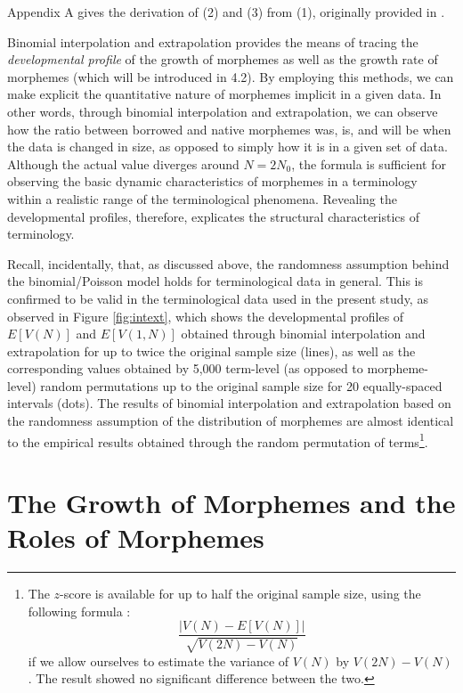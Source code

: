 \noindent
Appendix A gives the derivation of (2) and (3) from (1), originally provided
in \cite{good56}.

Binomial interpolation and extrapolation provides the means of tracing
the {\it developmental profile} of the growth of morphemes as well as the
growth rate of morphemes (which will be introduced in 4.2). By employing this 
methods, we can make explicit the quantitative nature of morphemes implicit in a
given data. In other words, through binomial interpolation and extrapolation,
we can observe how the ratio between borrowed and native morphemes was,
is, and will be when the data is changed in size, as opposed to simply how it
is in a given set of data. Although the actual value diverges around $N = 2N_0$,
the formula is sufficient for observing the basic dynamic characteristics of
morphemes in a terminology within a realistic range of the terminological
phenomena. Revealing the developmental profiles, therefore, explicates
the structural characteristics of terminology.

Recall, incidentally, that, as discussed above, the randomness assumption
behind the binomial/Poisson model holds for terminological data in
general. This is confirmed to be valid in the terminological data used
in the present study, as observed in Figure \ref{fig:intext}, which shows
the developmental profiles of $E[V(N)]$ and $E[V(1,N)]$ obtained through binomial
interpolation and extrapolation for up to twice the original sample size (lines),
as well as the corresponding values obtained by 5,000 term-level (as opposed
to morpheme-level) random permutations up to the original sample size for 
20 equally-spaced intervals (dots). The
results of binomial interpolation and extrapolation based on the randomness
assumption of the distribution of morphemes are almost identical to the
empirical results obtained through the random permutation of terms\footnote{The
$z$-score is available for up to half the original sample size, using the
following formula \cite{baayen01}:
\begin{displaymath}
\frac{|V(N) - E[V(N)]|}{\sqrt{V(2N)-V(N)}}
\end{displaymath}
if we allow ourselves to estimate the variance of $V(N)$ by $V(2N) - V(N)$.
The result showed no significant difference between the two.}.


\section{The Growth of Morphemes and the Roles of Morphemes}

